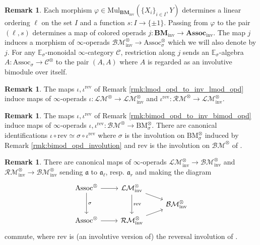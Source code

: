 \documentclass{article}
\renewcommand{\phi}{\varphi}
\newcommand{\EE}{\mathbb{E}}
\newcommand{\Associnv}{\mathrm{Assoc}_\sigma}
\newcommand{\BMinv}{\mathrm{BM}_\sigma} %
\theoremstyle{definition}
\newtheorem{remark}[equation]{Remark}
\newcommand{\Lucy}[1]{\todo[color=cyan!30]{\footnotesize L: #1}}
\begin{document}
\begin{remark}\label{rmk:inv_bimod_opd_to_inv_alg_opd} %
    Each morphism $ \phi \in \mathrm{Mul}_{\mathbf{BM}_\mathrm{inv}} \left(\{X_i\}_{i \in I}, Y\right) $ determines a linear ordering $\ell $ on the set $ I $ and a function $ s \colon I \to \{\pm 1\} $. 
    Passing from $ \phi $ to the pair $ (\ell, s) $ determines a map of colored operads $ j \colon \mathbf{BM}_\mathrm{inv} \to \mathbf{Assoc}_\mathrm{inv} $. 
    The map $ j $ induces a morphism of $ \infty $-operads $  \mathcal{BM}_{\mathrm{inv}}^\otimes \to \Associnv^\otimes $ which we will also denote by $ j $. 
    For any $ \EE_\sigma $-monoidal $ \infty $-category $ \mathcal{C} $, restriction along $ j $ sends an $ \EE_\sigma $-algebra $ A \colon \Associnv \to \mathcal{C}^{\otimes} $ to the pair $ (A, A) $ where $ A $ is regarded as an involutive bimodule\Lucy{hermitian} over itself. 
\end{remark} 
\begin{remark}\label{rmk:lmod_infty_opd_to_inv_lmod_infty_opd}
    The maps $ \iota, \iota^{\mathrm{rev}} $ of Remark \ref{rmk:lmod_opd_to_inv_lmod_opd} induce maps of $ \infty $-operads $ \iota \colon \mathcal{LM}^\otimes \to \mathcal{LM}^\otimes_{\mathrm{inv}} $ and $ \iota^{\mathrm{rev}} \colon \mathcal{RM}^\otimes \to \mathcal{LM}^\otimes_{\mathrm{inv}} $. 
\end{remark}
\begin{remark}\label{rmk:bimod_infty_opd_to_inv_bimod_infty_opd}
    The maps $ \iota, \iota^{\mathrm{rev}} $ of Remark \ref{rmk:bimod_opd_to_inv_bimod_opd} induce maps of $ \infty $-operads $ \iota, \iota^{\mathrm{rev}} \colon \mathcal{BM}^\otimes \to \BMinv^\otimes $. 
    There are canonical identifications $ \iota \circ \mathrm{rev} \simeq \sigma \circ \iota^{\mathrm{rev}} $ where $ \sigma $ is the involution on $ \BMinv^\otimes $ induced by Remark \ref{rmk:bimod_opd_involution} and $ \mathrm{rev} $ is the involution on $ \mathcal{BM}^\otimes $ of \cite[Construction 4.6.3.1]{LurHA}. 
\end{remark}
\begin{remark}\label{rmk:rmod_lmod_opd_to_inv_bimod_opd}
    There are canonical maps of $ \infty $-operads $ \mathcal{LM}^\otimes_{\mathrm{inv}} \to \mathcal{BM}^\otimes_{\mathrm{inv}} $ and $ \mathcal{RM}^\otimes_{\mathrm{inv}} \to \mathcal{BM}^\otimes_{\mathrm{inv}} $ sending $ \mathfrak{a} $ to $ \mathfrak{a}_\ell $, resp. $ \mathfrak{a}_r $ and making the diagram 
    \begin{equation*}
    \begin{tikzcd}[row sep=tiny]
        \mathrm{Assoc}^\otimes \ar[dd,"\sigma"] \ar[r] & \mathcal{LM}^\otimes_{\mathrm{inv}} \ar[dd,"{\mathrm{rev}}"] \ar[rd] & \\
        & & \mathcal{BM}^\otimes_{\mathrm{inv}}  \\ 
        \mathrm{Assoc}^\otimes  \ar[r] & \mathcal{RM}^\otimes_{\mathrm{inv}} \ar[ru] & 
    \end{tikzcd}   
    \end{equation*}
    commute, where $ \mathrm{rev} $ is (an involutive version of) the reversal involution of \cite[Remark 4.6.3.2]{LurHA}. 
\end{remark}
\end{document}

